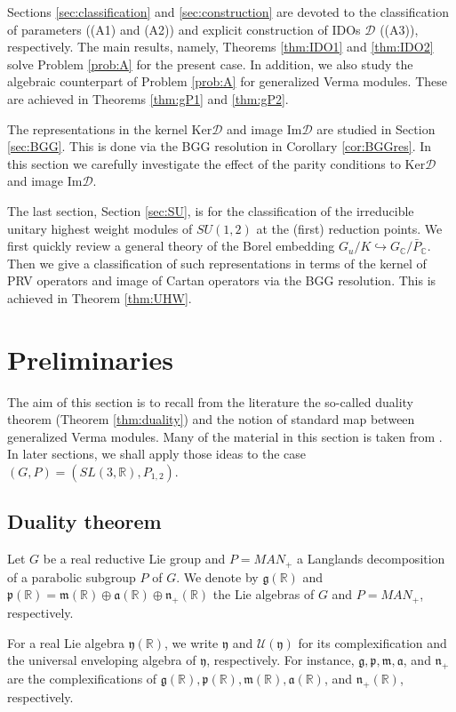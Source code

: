 \documentclass[reqno,11pt]{amsart}
\theoremstyle{remark}
\numberwithin{equation}{section}
\newcommand{\fa}{{\mathfrak a}}
\newcommand{\fg}{{\mathfrak g}}
\newcommand{\fm}{{\mathfrak m}}
\newcommand{\fn}{{\mathfrak n}}
\newcommand{\fp}{{\mathfrak p}}
\newcommand{\fy}{{\mathfrak y}}
\newcommand{\f}{\mathfrak}
\newcommand{\R}{\mathbb{R}}
\newcommand{\C}{\mathbb{C}}
\newcommand{\Cal}{\mathcal}
\renewcommand{\Im}{\mathrm{Im}}
\newcommand{\D}{\Cal{D}}
\newcommand{\Ker}{\mathrm{Ker}}
\begin{document}
Sections \ref{sec:classification} and \ref{sec:construction} are devoted to
the classification of parameters ((A1) and (A2))
and explicit construction of IDOs $\D$ ((A3)), respectively. 
The main results, namely, Theorems \ref{thm:IDO1} and \ref{thm:IDO2}
solve Problem \ref{prob:A} for the present case. In addition,
we also study the algebraic counterpart of Problem \ref{prob:A} 
for generalized Verma modules. These are achieved in 
Theorems \ref{thm:gP1} and \ref{thm:gP2}.

The representations in the kernel $\Ker \D$ and image $\Im \D$ are studied in 
Section \ref{sec:BGG}. 
This is done via the BGG resolution in Corollary \ref{cor:BGGres}.
In this section we carefully investigate the effect of the parity conditions
to $\Ker \D$ and image $\Im \D$.

The last section, Section \ref{sec:SU}, is for the classification of  the irreducible 
unitary highest weight modules of $SU(1,2)$  at the (first) reduction points.
We first quickly review a general theory of the Borel embedding 
$G_u/K \hookrightarrow G_\C/\bar{P}_\C$. Then we give a classification
of such representations in terms of the kernel of PRV operators 
and image of Cartan operators via the BGG resolution. 
This is achieved in Theorem \ref{thm:UHW}.

\section{Preliminaries}\label{sec:Prelim}

The aim of this section is to recall from the literature 
the so-called duality theorem
(Theorem \ref{thm:duality}) and the notion of standard map
between generalized Verma modules.
Many of the material in this section is taken from \cite{KuOr25a}.
In later sections, we shall apply those ideas to the case $(G,P)=(SL(3,\R), P_{1,2})$.

\subsection{Duality theorem}\label{sec:prelim}
Let $G$ be a real reductive Lie group and $P=MAN_+ $ a Langlands decomposition of a parabolic subgroup $P$ of $G$. We denote by $\fg(\R)$ and 
$\fp(\R) = \fm(\R) \oplus \fa(\R) \oplus \fn_+(\R)$ the Lie algebras of $G$ and 
$P=MAN_+$, respectively.


 For a real Lie algebra $\f{y}(\R)$, we write $\f{y}$
and $\Cal{U}(\fy)$ for its complexification and the universal enveloping algebra of 
$\fy$, respectively. 
For instance, $\fg, \fp, \fm, \fa$, and $\fn_+$ are the complexifications of $\fg(\R), \fp(\R), \fm(\R), \fa(\R)$, and $\fn_+(\R)$, 
respectively.
\end{document}
